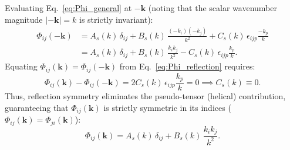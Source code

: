 \documentclass[lineno]{jfm}
\begin{document}
Evaluating Eq.~\eqref{eq:Phi_general} at $-\mathbf{k}$ (noting that the scalar wavenumber magnitude $|-\mathbf{k}| = k$ is strictly invariant):
\begin{align}
\Phi_{ij}(-\mathbf{k}) &= A_s(k)\,\delta_{ij} + B_s(k)\,\frac{(-k_i)(-k_j)}{k^2} + C_s(k)\,\epsilon_{ijp} \frac{-k_p}{k} \nonumber \\
&= A_s(k)\,\delta_{ij} + B_s(k)\,\frac{k_i k_j}{k^2} - C_s(k)\,\epsilon_{ijp} \frac{k_p}{k}.
\end{align}
Equating $\Phi_{ij}(\mathbf{k}) = \Phi_{ij}(-\mathbf{k})$ from Eq.~\eqref{eq:Phi_reflection} requires:
\begin{equation}
\Phi_{ij}(\mathbf{k}) - \Phi_{ij}(-\mathbf{k}) = 2C_s(k)\,\epsilon_{ijp}\frac{k_p}{k} = 0 \implies C_s(k) \equiv 0.
\end{equation}
Thus, reflection symmetry eliminates the pseudo-tensor (helical) contribution, guaranteeing that $\Phi_{ij}(\mathbf{k})$ is strictly symmetric in its indices ($\Phi_{ij}(\mathbf{k}) = \Phi_{ji}(\mathbf{k})$):
\begin{equation}
\Phi_{ij}(\mathbf{k}) = A_s(k)\,\delta_{ij} + B_s(k)\,\frac{k_i k_j}{k^2}.
\label{eq:Phi_symmetric}
\end{equation}
\end{document}
